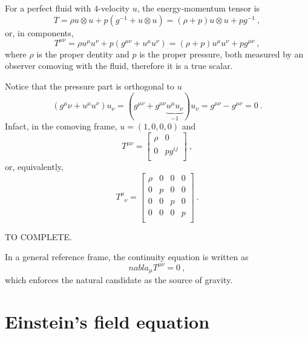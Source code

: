     For a perfect fluid with $4$-velocity $u$, the energy-momentum tensor is 
    \begin{equation*}
        T = \rho u \otimes u + p (g^{-1} + u \otimes u) = (\rho + p) u \otimes u + p g^{-1} ~,
    \end{equation*}
    or, in components,
    \begin{equation*}
        T^{\mu\nu} = \rho u^\mu u^\nu + p (g^{\mu\nu} + u^\mu u^\nu) = (\rho + p) u^\mu u^\nu + p g^{\mu\nu} ~,
    \end{equation*}
    where $\rho$ is the proper dentity and $p$ is the proper pressure, both measured by an observer comoving with the fluid, therefore it is a true scalar. 

    Notice that the pressure part is orthogonal to $u$
    \begin{equation*}
        (g^\mu\nu + u^\mu u^\nu) u_\nu = (g^{\mu\nu} + g^{\mu\nu} \underbrace{u^\mu u_\nu }_{-1}) u_\nu = g^{\mu\nu} - g^{\mu\nu} = 0~.
    \end{equation*}
    Infact, in the comoving frame, $u = (1, 0, 0, 0)$ and 
    \begin{equation*}
        T^{\mu\nu} = \begin{bmatrix}
            \rho & 0 \\ 0 & p g^{ij} \\
        \end{bmatrix} ~,
    \end{equation*}
    or, equivalently, 
    \begin{equation*}
        T^\mu_{\phantom \mu \nu} = \begin{bmatrix}
            \rho & 0 & 0 & 0 \\
            0 & p & 0 & 0 \\
            0 & 0 & p & 0 \\
            0 & 0 & 0 & p \\
        \end{bmatrix} ~.
    \end{equation*}
    
    TO COMPLETE. 

    In a general reference frame, the continuity equation is written as 
    \begin{equation*}
        nabla_\mu T^{\mu\nu} = 0 ~,
    \end{equation*}
    which enforces the natural candidate as the source of gravity. 

\section{Einstein's field equation} 

